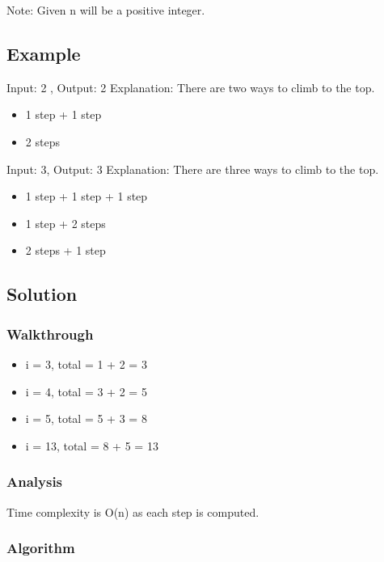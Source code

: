 \documentclass[]{book}
\begin{document}
Note: Given n will be a positive integer.

\hypertarget{example-29}{%
\subsection{Example}\label{example-29}}

Input: 2 , Output: 2
Explanation: There are two ways to climb to the top.

\begin{itemize}
\item 1 step + 1 step
\item 2 steps
\end{itemize}

Input: 3, Output: 3
Explanation: There are three ways to climb to the top.

\begin{itemize}
\item 1 step + 1 step + 1 step
\item 1 step + 2 steps
\item 2 steps + 1 step
\end{itemize}

\hypertarget{solution-23}{%
\subsection{Solution}\label{solution-23}}

\hypertarget{walkthrough-29}{%
\subsubsection{Walkthrough}\label{walkthrough-29}}

\begin{itemize}
\item i = 3, total = 1 + 2 = 3
\item i = 4, total = 3 + 2 = 5
\item i = 5, total = 5 + 3 = 8
\item i = 13, total = 8 + 5 = 13
\end{itemize}

\hypertarget{analysis-32}{%
\subsubsection{Analysis}\label{analysis-32}}

Time complexity is O(n) as each step is computed.

\hypertarget{algorithm-32}{%
\subsubsection{Algorithm}\label{algorithm-32}}
\end{document}
